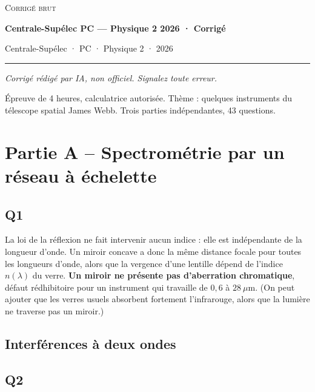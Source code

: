 \documentclass[11pt,a4paper]{article}
\begin{document}
\thispagestyle{plain}
\begin{center}
  {\small\scshape Corrigé brut}\par\smallskip
  {\LARGE\bfseries Centrale-Supélec PC — Physique 2 2026 · Corrigé\par}\medskip
  {\large Centrale-Supélec · PC · Physique 2 · 2026\par}
\end{center}
\vspace{2pt}\hrule\vspace{8pt}

\emph{Corrigé rédigé par IA, non officiel. Signalez toute erreur.}

Épreuve de 4 heures, calculatrice autorisée. Thème : quelques instruments du télescope spatial James Webb. Trois parties indépendantes, 43 questions.

\hypertarget{partie-a-spectromuxe9trie-par-un-ruxe9seau-uxe0-uxe9chelette}{%
\section{Partie A -- Spectrométrie par un réseau à échelette}\label{partie-a-spectromuxe9trie-par-un-ruxe9seau-uxe0-uxe9chelette}}

\hypertarget{q1}{%
\subsection{Q1}\label{q1}}

La loi de la réflexion ne fait intervenir aucun indice : elle est indépendante de la longueur d'onde. Un miroir concave a donc la même distance focale pour toutes les longueurs d'onde, alors que la vergence d'une lentille dépend de l'indice \(n(\lambda)\) du verre. \textbf{Un miroir ne présente pas d'aberration chromatique}, défaut rédhibitoire pour un instrument qui travaille de \(0{,}6\) à \(28\ \mu\text{m}\). (On peut ajouter que les verres usuels absorbent fortement l'infrarouge, alors que la lumière ne traverse pas un miroir.)

\hypertarget{interfuxe9rences-uxe0-deux-ondes}{%
\subsection{Interférences à deux ondes}\label{interfuxe9rences-uxe0-deux-ondes}}

\hypertarget{q2}{%
\subsection{Q2}\label{q2}}
\end{document}
